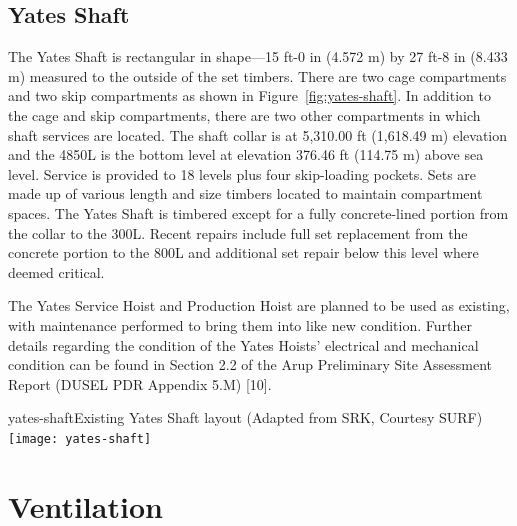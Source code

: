 \subsection{Yates Shaft}
\label{sec:fscf-und-shafts-yates}

The Yates Shaft is rectangular in shape—15 ft-0 in (4.572 m) by 27 ft-8 in (8.433 m) measured to the outside of the set timbers. There are two cage compartments and two skip compartments as shown in Figure~\ref{fig:yates-shaft}. In addition to the cage and skip compartments, there are two other compartments in which shaft services are located. The shaft collar is at 5,310.00 ft (1,618.49 m) elevation and the 4850L is the bottom level at elevation 376.46 ft (114.75 m) above sea level. Service is provided to 18 levels plus four skip-loading pockets. Sets are made up of various length and size timbers located to maintain compartment spaces. The Yates Shaft is timbered except for a fully concrete-lined portion from the collar to the 300L. Recent repairs include full set replacement from the concrete portion to the 800L and additional set repair below this level where deemed critical.

The Yates Service Hoist and Production Hoist are planned to be used as existing, with maintenance performed to bring them into like new condition. Further details regarding the condition of the Yates Hoists' electrical and mechanical condition can be found in Section 2.2 of the Arup Preliminary Site Assessment Report (DUSEL PDR Appendix 5.M) [10].

\begin{cdrfigure}{yates-shaft}{Existing Yates Shaft layout (Adapted from SRK, Courtesy SURF)}
\texttt{[image: yates-shaft]}
\end{cdrfigure}



\section{Ventilation}
\label{sec:fscf-und-vent}

